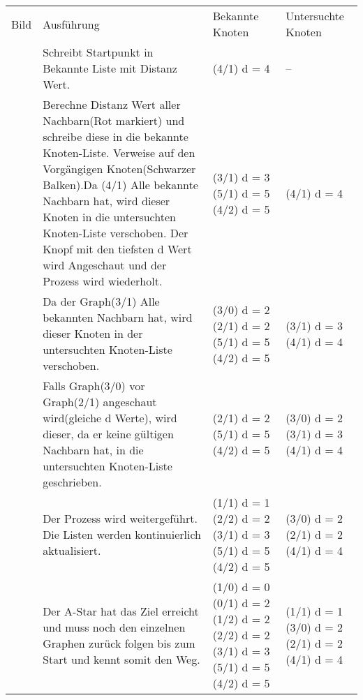 \begin{table}[H]
  \begin{center}
    \begin{tabular}{ c  p{8cm}  p{2cm}   p{2cm} }
      \toprule
      Bild & Ausführung & Bekannte Knoten & Untersuchte Knoten \\ 
      \cmidrule(r){1-1}\cmidrule(lr){2-2}\cmidrule(l){3-3}\cmidrule(l){4-4}
      \raisebox{-\totalheight}{\texttt{[image: image1]}}
      & 
      Schreibt Startpunkt in Bekannte Liste mit Distanz Wert.
      & 
      (4/1) d = 4
      & 
      --
      \\ \bottomrule %
      \raisebox{-\totalheight}{\texttt{[image: image2]}}
      & 
      Berechne Distanz Wert aller Nachbarn(Rot markiert) und schreibe diese in die bekannte Knoten-Liste. Verweise auf den Vorgängigen Knoten(Schwarzer Balken).Da (4/1) Alle bekannte Nachbarn hat, wird dieser Knoten in die untersuchten Knoten-Liste verschoben. Der Knopf mit den tiefsten d Wert wird Angeschaut und der Prozess wird wiederholt.
      & 
      (3/1) d = 3
      (5/1) d = 5
      (4/2) d = 5
      & 
      (4/1) d = 4
      \\ \bottomrule %
      \raisebox{-\totalheight}{\texttt{[image: image3]}}
      & 
      Da der Graph(3/1) Alle bekannten Nachbarn hat, wird dieser Knoten in der untersuchten Knoten-Liste verschoben.
      & 
      (3/0) d = 2
      (2/1) d = 2
      (5/1) d = 5
      (4/2) d = 5
      & 
      (3/1) d = 3
      (4/1) d = 4
      \\ \bottomrule %
      \raisebox{-\totalheight}{\texttt{[image: image4]}}
      & 
      Falls Graph(3/0) vor Graph(2/1) angeschaut wird(gleiche d Werte), wird dieser, da er keine gültigen Nachbarn hat, in die untersuchten Knoten-Liste geschrieben.
      & 
      (2/1) d = 2
      (5/1) d = 5
      (4/2) d = 5
      & 
      (3/0) d = 2
      (3/1) d = 3
      (4/1) d = 4
      \\ \bottomrule %
      \raisebox{-\totalheight}{\texttt{[image: image5]}}
      & 
      Der Prozess wird weitergeführt. Die Listen werden kontinuierlich aktualisiert.
      & 
      (1/1) d = 1
      (2/2) d = 2
      (3/1) d = 3
      (5/1) d = 5
      (4/2) d = 5
      & 
      (3/0) d = 2
      (2/1) d = 2
      (4/1) d = 4
      \\ \bottomrule %
      \raisebox{-\totalheight}{\texttt{[image: image6]}}
      & 
      Der A-Star hat das Ziel erreicht und muss noch den einzelnen Graphen zurück folgen bis zum Start und kennt somit den Weg.
      & 
      (1/0) d = 0
      (0/1) d = 2
      (1/2) d = 2
      (2/2) d = 2
      (3/1) d = 3
      (5/1) d = 5
      (4/2) d = 5
      & 
      (1/1) d = 1
      (3/0) d = 2
      (2/1) d = 2
      (4/1) d = 4
      \\ \bottomrule %
    \end{tabular}
  \end{center}
\end{table}
